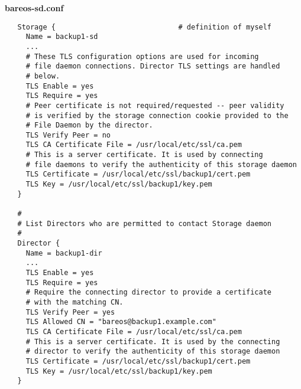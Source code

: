 {\bf bareos-sd.conf}
\footnotesize
\begin{verbatim}
   Storage {                             # definition of myself
     Name = backup1-sd
     ...
     # These TLS configuration options are used for incoming
     # file daemon connections. Director TLS settings are handled
     # below.
     TLS Enable = yes
     TLS Require = yes
     # Peer certificate is not required/requested -- peer validity
     # is verified by the storage connection cookie provided to the
     # File Daemon by the director.
     TLS Verify Peer = no
     TLS CA Certificate File = /usr/local/etc/ssl/ca.pem
     # This is a server certificate. It is used by connecting
     # file daemons to verify the authenticity of this storage daemon
     TLS Certificate = /usr/local/etc/ssl/backup1/cert.pem
     TLS Key = /usr/local/etc/ssl/backup1/key.pem
   }

   #
   # List Directors who are permitted to contact Storage daemon
   #
   Director {
     Name = backup1-dir
     ...
     TLS Enable = yes
     TLS Require = yes
     # Require the connecting director to provide a certificate
     # with the matching CN.
     TLS Verify Peer = yes
     TLS Allowed CN = "bareos@backup1.example.com"
     TLS CA Certificate File = /usr/local/etc/ssl/ca.pem
     # This is a server certificate. It is used by the connecting
     # director to verify the authenticity of this storage daemon
     TLS Certificate = /usr/local/etc/ssl/backup1/cert.pem
     TLS Key = /usr/local/etc/ssl/backup1/key.pem
   }
\end{verbatim}
\normalsize
